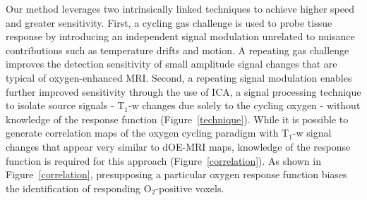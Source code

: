 Our method leverages two intrinsically linked techniques to achieve higher speed and greater sensitivity.
First, a cycling gas challenge is used to probe tissue response by introducing an independent signal modulation unrelated to nuisance contributions such as temperature drifts and motion.
A repeating gas challenge improves the detection sensitivity of small amplitude signal changes that are typical of oxygen-enhanced MRI.
	 Second, a repeating signal modulation enables further improved sensitivity through the use of ICA, a signal processing technique to isolate source signals - T$_1$-w changes due solely to the cycling oxygen - without knowledge of the response function (Figure~\ref{technique}).
While it is possible to generate correlation maps of the oxygen cycling paradigm with T$_1$-w signal changes that appear very similar to dOE-MRI maps, knowledge of the response function is required for this approach (Figure~\ref{correlation}).
As shown in Figure~\ref{correlation}, presupposing a particular oxygen response function biases the identification of responding O$_2$-positive voxels.

